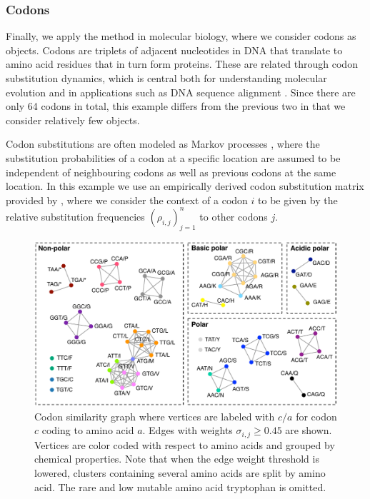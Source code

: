 \documentclass{kais}
\newcommand{\rn}[1]{\rho_{#1}}
\newcommand{\sy}[1]{\sigma_{#1}}
\begin{document}
\subsubsection{Codons}

Finally, we apply the method in molecular biology, where we consider codons as objects. Codons are triplets of
adjacent nucleotides in DNA that translate to amino acid residues that in turn form proteins.  These are related
through codon substitution dynamics, which is central both for understanding molecular evolution and in applications
such as DNA sequence alignment \cite{Anisimova09}. Since there are only 64 codons in total, this example differs from
the previous two in that we consider relatively few objects.

Codon substitutions are often modeled as Markov processes \cite{Anisimova09}, where the
substitution probabilities of a codon at a specific location are assumed to be independent of neighbouring codons as
well as previous codons at the same location. In this example we use an empirically derived codon substitution matrix 
provided by , where we consider the context of a codon $i$ to be given by the relative substitution frequencies
$(\rn{i,j})_{j=1}^n$ to other codons $j$.

\begin{figure}
\centerline{\includegraphics[width=0.9\columnwidth]{figures/codon-example.pdf}}
\caption{Codon similarity graph where vertices are labeled with $c/a$ for codon $c$ coding to amino acid $a$. Edges
with weights $\sy{i,j} \geq 0.45$ are shown. Vertices are color coded with respect to amino acids and grouped by
chemical properties. Note that when the edge weight threshold is lowered, clusters containing several amino acids are split by
amino acid. The rare and low mutable amino acid tryptophan is omitted. }
\label{fig:codons}
\end{figure}
\end{document}

